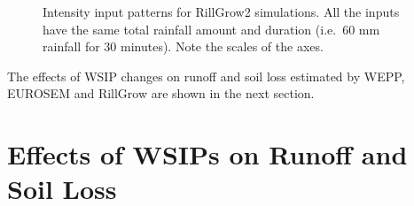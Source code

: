 \begin{figure}[htbp]
  \centering
  \caption[Intensity input patterns for RillGrow2 simulations.]{Intensity
input patterns for RillGrow2 simulations. All the inputs have the same total
rainfall amount and duration (i.e.\ 60 mm rainfall for 30 minutes). Note the
scales of the axes.}
  \label{fig:rillgrow2intensityinputs}
\end{figure}

The effects of WSIP changes on runoff and soil loss estimated by WEPP, EUROSEM
and RillGrow are shown in the next section.

\section{Effects of WSIPs on Runoff and Soil Loss}
\label{sec:ImplicationsOfRainfallIntensityChangesOnRunoffandSoilLoss}


